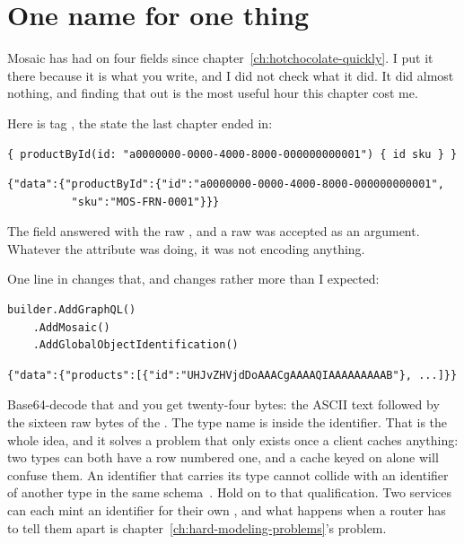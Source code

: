 \section{One name for one thing}
\label{sec:ch05-one-name-for-one-thing}

Mosaic has had \code{[ID]} on four fields since
chapter~\ref{ch:hotchocolate-quickly}. I put it there because it is what you
write, and I did not check what it did. It did almost nothing, and finding that
out is the most useful hour this chapter cost me.

Here is tag , the state the last chapter ended in:

\begin{verbatim}
{ productById(id: "a0000000-0000-4000-8000-000000000001") { id sku } }
\end{verbatim}

\begin{verbatim}
{"data":{"productById":{"id":"a0000000-0000-4000-8000-000000000001",
          "sku":"MOS-FRN-0001"}}}
\end{verbatim}

The  field answered with the raw , and a raw  was
accepted as an \code{[ID]} argument. Whatever the attribute was doing, it was
not encoding anything.

%
One line in  changes that, and changes rather more than I
expected:

\begin{verbatim}
builder.AddGraphQL()
    .AddMosaic()
    .AddGlobalObjectIdentification()
\end{verbatim}

\begin{verbatim}
{"data":{"products":[{"id":"UHJvZHVjdDoAAACgAAAAQIAAAAAAAAAB"}, ...]}}
\end{verbatim}

%
Base64-decode that and you get twenty-four bytes: the ASCII text
 followed by the sixteen raw bytes of the . The type
name is inside the identifier. That is the whole idea, and it solves a problem
that only exists once a client caches anything: two types can both have a row
numbered one, and a cache keyed on  alone will confuse them. An
identifier that carries its type cannot collide with an identifier of another
type in the same schema~\autocite{chillicream2026relay}. Hold on to that
qualification. Two services can each mint an identifier for their own
, and what happens when a router has to tell them apart is
chapter~\ref{ch:hard-modeling-problems}'s problem.

